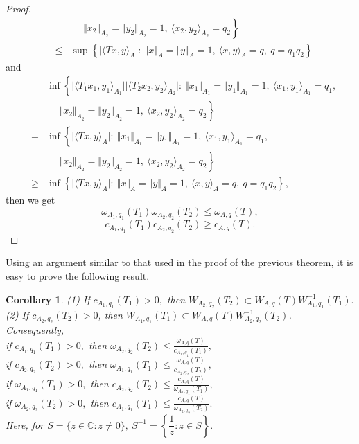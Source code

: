 \documentclass[preprint,12pt,3p]{elsarticle}
\newtheorem{corollary}{Corollary}
\begin{document}
\begin{proof}
\begin{eqnarray}
& & \ \ \ \ \ \ \left.  \Vert x_{2} \Vert_{A_{2}}=\Vert y_{2} \Vert_{A_{2}}=1, \ \langle x_{2},y_{2}\rangle_{A_{2}} =q_{2}  \right\rbrace   \nonumber \\
& \leq &  \sup \left\lbrace  \vert \langle Tx, y\rangle_{A} \vert : \ \Vert x \Vert_{A}=\Vert y \Vert_{A}=1, \ \langle x,y\rangle_{A} =q, \ q=q_{1}q_{2} \right\rbrace   \nonumber 
\end{eqnarray}
and
\begin{eqnarray}
& & \inf \left\lbrace  \vert \langle T_{1}x_{1}, y_{1}\rangle_{A_{1}} \vert \vert \langle T_{2}x_{2}, y_{2}\rangle_{A_{2}} \vert: \ \Vert x_{1} \Vert_{A_{1}}=\Vert y_{1} \Vert_{A_{1}}=1, \ \langle x_{1},y_{1}\rangle_{A_{1}} =q_{1}, \right.  \nonumber \\
& & \ \ \ \ \ \ \left.  \Vert x_{2} \Vert_{A_{2}}=\Vert y_{2} \Vert_{A_{2}}=1, \ \langle x_{2},y_{2}\rangle_{A_{2}} =q_{2}  \right\rbrace   \nonumber \\
& = & \inf \left\lbrace  \vert \langle Tx, y\rangle_{A} \vert : \ \Vert x_{1} \Vert_{A_{1}}=\Vert y_{1} \Vert_{A_{1}}=1, \ \langle x_{1},y_{1}\rangle_{A_{1}} =q_{1}, \right.  \nonumber \\
& & \ \ \ \ \ \ \left.  \Vert x_{2} \Vert_{A_{2}}=\Vert y_{2} \Vert_{A_{2}}=1, \ \langle x_{2},y_{2}\rangle_{A_{2}} =q_{2}  \right\rbrace   \nonumber \\
& \geq &  \inf \left\lbrace  \vert \langle Tx, y\rangle_{A} \vert : \ \Vert x \Vert_{A}=\Vert y \Vert_{A}=1, \ \langle x,y\rangle_{A} =q, \ q=q_{1}q_{2} \right\rbrace ,  \nonumber 
\end{eqnarray}
then we get
$$
\omega_{A_{1},q_{1}}(T_{1})\omega_{A_{2},q_{2}}(T_{2})\leq \omega_{A,q}(T),
$$
$$
c_{A_{1},q_{1}}(T_{1})c_{A_{2},q_{2}}(T_{2})\geq c_{A,q}(T).
$$
\end{proof}
Using an argument similar to that used in the proof of the previous theorem, it is easy to prove the following result.
\begin{corollary}
(1) If $ c_{A_{1},q_{1}}(T_{1})>0 ,$ then $ W_{A_{2},q_{2}}(T_{2})\subset W_{A,q}(T)W_{A_{1},q_{1}}^{-1}(T_{1}). $ \\
(2) If $ c_{A_{2},q_{2}}(T_{2})>0 $, then $ W_{A_{1},q_{1}}(T_{1})\subset W_{A,q}(T)W_{A_{2},q_{2}}^{-1}(T_{2}) $. \\
Consequently, \\
if $c_{A_{1},q_{1}}(T_{1})>0, $ then $ \omega_{A_{2},q_{2}}(T_{2})\leq \frac{\omega_{A,q}(T)}{c_{A_{1},q_{1}}(T_{1})}, $  \\
if $c_{A_{2},q_{2}}(T_{2})>0, $ then $ \omega_{A_{1},q_{1}}(T_{1})\leq \frac{\omega_{A,q}(T)}{c_{A_{2},q_{2}}(T_{2})}, $\\
if $\omega_{A_{1},q_{1}}(T_{1})>0 , $ then $ c_{A_{2},q_{2}}(T_{2})\leq \frac{c_{A,q}(T)}{\omega_{A_{1},q_{1}}(T_{1})}, $\\
if $\omega_{A_{2},q_{2}}(T_{2})>0, $ then $ c_{A_{1},q_{1}}(T_{1})\leq \frac{c_{A,q}(T)}{\omega_{A_{2},q_{2}}(T_{2})}. $\\
Here, for $ S=\lbrace z\in \mathbb{C}: z\neq 0 \rbrace , \ S^{-1}= \left\lbrace \dfrac{1}{z}: z\in S  \right\rbrace .  $
\end{corollary}
\end{document}
